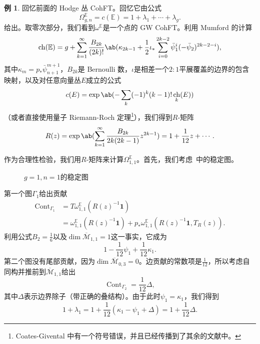 \documentclass{amsart}
\theoremstyle{definition}
\newtheorem{exm}[thm]{例}
\theoremstyle{remark}
\theoremstyle{plain}
\theoremstyle{definition}
\theoremstyle{remark}
\newcommand{\E}{\mathbb{E}}
\newcommand{\Mbar}{\overline{\mathcal{M}}}
\newcommand{\1}{\mathbf{1}}
\newcommand{\2}{\mathbf{2}}
\newcommand{\3}{\mathbf{3}}
\DeclareMathOperator{\ch}{ch}
\DeclareMathOperator{\Cont}{Cont}
\begin{document}
\begin{exm}
    回忆前面的 Hodge 丛 CohFT。回忆它由公式
    \[ \Omega^{\E}_{g,n} = c(\E) = 1 + \lambda_1 + \cdots + \lambda_g. \]
    给出。取零次部分，我们看到$\omega^{\E}$是一个点的 GW CohFT。利用 Mumford 的计算
    \[ \ch(\E) = g + \sum_{k=1}^{\infty} \frac{B_{2k}}{(2k)!}\ab(\kappa_{2k-1} + \frac{1}{2}\iota_*\sum_{i=0}^{2k-2} \bar{\psi}_1^{i} (-\bar{\psi}_2)^{2k-2-i}), \]
    其中$\kappa_{m} = p_* \bar{\psi}_{n+1}^{m+1}$，$B_{2k}$是 Bernoulli 数，$\iota$是相差一个$2:1$平展覆盖的边界的包含映射，以及对任意向量丛$E$成立的公式
    \[ c(E) = \exp \ab(-\sum_k (-1)^k (k-1)!\ch_k(E)) \]
    （或者直接使用量子 Riemann-Roch 定理\footnote{Coates-Givental 中有一个符号错误，并且已经传播到了其余的文献中。}），我们得到$R$-矩阵
    \[ R(z) = \exp\ab( \sum_{k=1}^{\infty} \frac{B_{2k}}{2k(2k-1)} z^{2k-1}) = 1+\frac{1}{12}z + \cdots. \]

    作为合理性检验，我们用$R$-矩阵来计算$\Omega_{1,1}^{\E}$。首先，我们考虑~中的稳定图。
    \begin{figure}[htpb]
    \begin{center}
    \end{center}
    \caption{$g=1, n=1$的稳定图}%
    \label{fig:03graphloop}
    \end{figure}
    第一个图$\Gamma_1$给出贡献
    \begin{align*}
        \Cont_{\Gamma_1} &= T\omega_{1,1}^{\E}(R(z)^{-1}\1) \\
        &= \omega_{1,1}^{\E}(R(z)^{-1}\1) + p_* \omega_{1,1}^{\E}(R(z)^{-1}\1, T_R(z)).
    \end{align*}
    利用公式$B_2 = \frac{1}{6}$以及$\dim \Mbar_{1,1} = 1$这一事实，它成为
    \[ 1 - \frac{1}{12}\psi_1 + \frac{1}{12} \kappa_1. \]
    第二个图没有尾部贡献，因为$\dim \Mbar_{0,3} = 0$。边贡献的常数项是$\frac{1}{12}$，所以考虑自同构并推前到$\Mbar_{1,1}$给出
    \[ \Cont_{\Gamma_2} = \frac{1}{12} \Delta, \]
    其中$\Delta$表示边界除子（带正确的叠结构）。由于此时$\psi_1 = \kappa_1$，我们得到
    \[ 1+\lambda_1 = 1 + \frac{1}{12}(\kappa_1 - \psi_1 + \Delta) = 1 + \frac{1}{12} \Delta. \]
\end{exm}
\end{document}

